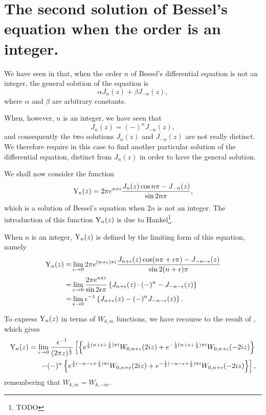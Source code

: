 \documentclass{book}
\begin{document}
    \section{The second solution of Bessel's equation when the order
      is an integer.}
    We have seen in  that, when the order $n$ of
    Bessel's differential equation is not an integer, the general
    solution of the equation is
    $$
    \alpha J_n(z) + \beta J_{-n}(z),
    $$
    where $\alpha$ and $\beta$ are arbitrary constants.

    When, however, $n$ is an integer, we have seen that
    $$
    J_n(z) = (-)^n J_{-n}(z),
    $$
    and consequently the two solutions $J_n(z)$ and $J_{-n}(z)$ are
    not really distinct. We therefore require in this case to find
    another particular solution of the differential equation, distinct
    from $J_n(z)$ in order to have the general solution.

    We shall now consider the function
    $$
    \mathrm{Y}_n(z)
    =
    2 \pi e^{n \pi i}
    \frac{J_n(z)\cos n\pi - J_{-n}(z)}{\sin 2n\pi},
    $$
    which is a solution of Bessel's equation when $2n$ is not an
    integer.
    The introduction of this function $\mathrm{Y}_n(z)$ is due to
    Hankel\footnote{TODO}.

    When $n$ is an integer, $\mathrm{Y}_n(z)$ is defined by the limiting
    form of this equation, namely
    \begin{align*}
      \mathrm{Y}_n(z)
      =& \lim_{\epsilon\rightarrow 0}
      2\pi e^{(n+\epsilon)\pi i} \frac{ J_{n+\epsilon}(z) \cos(n\pi+\epsilon\pi) -
        J_{-n-\epsilon}(z)}{\sin 2(n+\epsilon)\pi}
      \\
      =& \lim_{\epsilon\rightarrow 0}
      \frac{2\pi e^{n\pi i}}{\sin 2\epsilon\pi}
      \left\{  J_{n+\epsilon}(z) \cdot(-)^n - J_{-n-\epsilon}(z) \right\}
      \\
      =&
      \lim_{\epsilon\rightarrow 0}
      \epsilon^{-1}
      \left\{  J_{n+\epsilon}(z) - (-)^n J_{-n-\epsilon}(z) \right\}.
    \end{align*}

    To express $\mathrm{Y}_n(z)$ in terms of $W_{k,m}$ functions, we have
    recourse to the result of , which gives
    \begin{align*}
      \mathrm{Y}_n(z)
      = \lim_{\epsilon\rightarrow 0}
      \frac{\epsilon^{-1}}{ (2\pi z)^{\frac{1}{2}}}
      \left[
        \left\{ 
          e^{\frac{1}{2}(n+\epsilon+\frac{1}{2})\pi i} W_{0,n+\epsilon}(2iz)
          + e^{-\frac{1}{2}(n+\epsilon+\frac{1}{2})\pi i} W_{0,n+\epsilon}(-2iz)
         \right\}
      \right.
      \\
      \left.
        - (-)^n
        \left\{ 
          e^{\frac{1}{2}(-n-\epsilon+\frac{1}{2})\pi i} W_{0,n+\epsilon}(2iz)
          + e^{-\frac{1}{2} (-n-\epsilon+\frac{1}{2})\pi i} W_{0,n+\epsilon}(-2iz)
         \right\}
      \right],
    \end{align*}
    remembering that $W_{k,m} = W_{k,-m}$.
\end{document}
